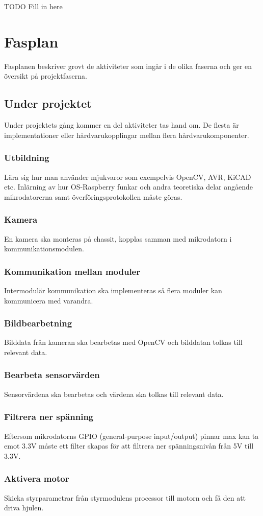 \documentclass[projektplan/plan.tex]{subfiles}
\begin{document}
TODO Fill in here
\section{Fasplan}
Fasplanen beskriver grovt de aktiviteter som ingår i de olika faserna och ger
en översikt på projektfaserna.
\subsection{Under projektet}
Under projektets gång kommer en del aktiviteter tas hand om. De flesta är
implementationer eller hårdvarukopplingar mellan flera hårdvarukomponenter.
\subsubsection*{Utbildning}
Lära sig hur man använder mjukvaror som exempelvis OpenCV, AVR, KiCAD etc.
Inlärning av hur OS-Raspberry funkar och andra teoretiska delar angående
mikrodatorerna samt överföringsprotokollen måste göras.
\subsubsection*{Kamera}
En kamera ska monteras på chassit, kopplas samman med mikrodatorn i
kommunikationsmodulen.
\subsubsection*{Kommunikation mellan moduler}
Intermodulär kommunikation ska implementeras så flera moduler kan kommunicera
med varandra.
\subsubsection*{Bildbearbetning}
Bilddata från kameran ska bearbetas med OpenCV och bilddatan tolkas till
relevant data.
\subsubsection*{Bearbeta sensorvärden}
Sensorvärdena ska bearbetas och värdena ska tolkas till relevant data.
\subsubsection*{Filtrera ner spänning}
Eftersom mikrodatorns GPIO (general-purpose input/output) pinnar max kan ta
emot 3.3V måste ett filter skapas för att filtrera ner spänningsnivån från 5V
till 3.3V.
\subsubsection*{Aktivera motor}
Skicka styrparametrar från styrmodulens processor till motorn och få den att
driva hjulen.
\end{document}
